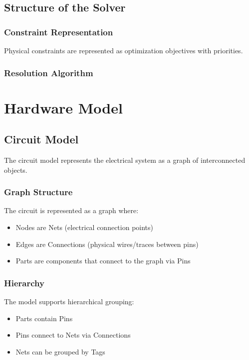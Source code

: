 \chapter{Structure of the Solver}

\section{Constraint Representation}
Physical constraints are represented as optimization objectives with priorities.

\section{Resolution Algorithm}




\part{Hardware Model}
\chapter{Circuit Model}
The circuit model represents the electrical system as a graph of interconnected objects.

\section{Graph Structure}
The circuit is represented as a graph where:
\begin{itemize}
\item Nodes are Nets (electrical connection points)
\item Edges are Connections (physical wires/traces between pins)
\item Parts are components that connect to the graph via Pins
\end{itemize}

\section{Hierarchy}
The model supports hierarchical grouping:
\begin{itemize}
\item Parts contain Pins
\item Pins connect to Nets via Connections
\item Nets can be grouped by Tags
\end{itemize}


